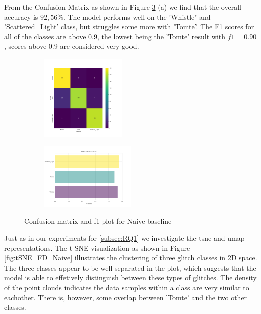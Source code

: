 From the Confusion Matrix as shown in Figure \ref{fig:cm_f1_FD_naive_baseline}-(a) we find that the overall accuracy is $92,56 \%$. The model performs well on the 'Whistle' and 'Scattered\_Light' class, but struggles some more with 'Tomte'. The F1 scores for all of the classes are above 0.9, the lowest being the 'Tomte' result with $f1=0.90$, scores above 0.9 are considered very good. 

\begin{figure}[ht]
\centering
\begin{subfigure}
  \centering
  \includegraphics[width=0.45\textwidth]{Images/cm_FD_model_naive.png}  
  \label{fig:fd_sub-first}
\end{subfigure}
\begin{subfigure}
  \centering
  \includegraphics[width=0.50\textwidth]{Images/f1_FD_model_naive.png}  
  \label{fig:fd_sub-second}
\end{subfigure}
\caption{Confusion matrix and f1 plot for Naive baseline}
\label{fig:cm_f1_FD_naive_baseline}
\end{figure}

Just as in our experiments for \ref{subsec:RQ1} we investigate the \acrshort{tsne} and \acrshort{umap} representations. 
The t-SNE visualization as shown in Figure \ref{fig:tSNE_FD_Naive} illustrates the clustering of three glitch classes in 2D space. The three classes appear to be well-separated in the plot, which suggests that the model is able to effetively distinguish between these types of glitches. The density of the point clouds indicates the data samples within a class are very similar to eachother. There is, however, some overlap between 'Tomte' and the two other classes.\\

